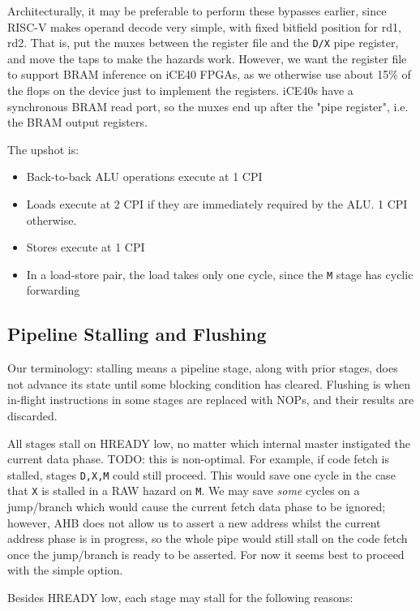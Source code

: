\documentclass{article}
\begin{document}
Architecturally, it may be preferable to perform these bypasses earlier, since RISC-V makes operand decode very simple, with fixed bitfield position for rd1, rd2. That is, put the muxes between the register file and the \texttt{D/X} pipe register, and move the taps to make the hazards work. However, we want the register file to support BRAM inference on iCE40 FPGAs, as we otherwise use about 15\% of the flops on the device just to implement the registers. iCE40s have a synchronous BRAM read port, so the muxes end up after the "pipe register", i.e. the BRAM output registers.

The upshot is:

\begin{itemize}
	\item Back-to-back ALU operations execute at 1 CPI
	\item Loads execute at 2 CPI if they are immediately required by the ALU. 1 CPI otherwise.
	\item Stores execute at 1 CPI
	\item In a load-store pair, the load takes only one cycle, since the \texttt{M} stage has cyclic forwarding
\end{itemize}

\subsection{Pipeline Stalling and Flushing}

Our terminology: stalling means a pipeline stage, along with prior stages, does not advance its state until some blocking condition has cleared. Flushing is when in-flight instructions in some stages are replaced with NOPs, and their results are discarded.

All stages stall on HREADY low, no matter which internal master instigated the current data phase. TODO: this is non-optimal. For example, if code fetch is stalled, stages \texttt{D,X,M} could still proceed. This would save one cycle in the case that \texttt{X} is stalled in a RAW hazard on \texttt{M}. We may save \textit{some} cycles on a jump/branch which would cause the current fetch data phase to be ignored; however, AHB does not allow us to assert a new address whilst the current address phase is in progress, so the whole pipe would still stall on the code fetch once the jump/branch is ready to be asserted. For now it seems best to proceed with the simple option.

Besides HREADY low, each stage may stall for the following reasons:
\end{document}
